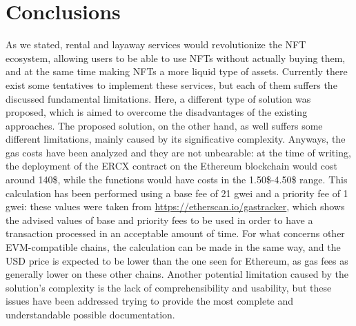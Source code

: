 \documentclass[english, LaM, oneside]{sapthesis}%
\begin{document}
\chapter{Conclusions}
As we stated, rental and layaway services would revolutionize the NFT ecosystem, allowing users to be able to use NFTs without actually buying them, and at the same time making NFTs a more liquid type of assets. \newline
Currently there exist some tentatives to implement these services, but each of them suffers the discussed fundamental limitations. Here, a different type of solution was proposed, which is aimed to overcome the disadvantages of the existing approaches. The proposed solution, on the other hand, as well suffers some different limitations, mainly caused by its significative complexity. Anyways, the gas costs have been analyzed and they are not unbearable: at the time of writing, the deployment of the ERCX contract on the Ethereum blockchain would cost around 140\$, while the functions would have costs in the 1.50\$-4.50\$ range. This calculation has been performed using a base fee of 21 gwei and a priority fee of 1 gwei: these values were taken from \url{https://etherscan.io/gastracker}, which shows the advised values of base and priority fees to be used in order to have a transaction processed in an acceptable amount of time. For what concerns other EVM-compatible chains, the calculation can be made in the same way, and the USD price is expected to be lower than the one seen for Ethereum, as gas fees as generally lower on these other chains.\newline
Another potential limitation caused by the solution's complexity is the lack of comprehensibility and usability, but these issues have been addressed trying to provide the most complete and understandable possible documentation. 
\end{document}
